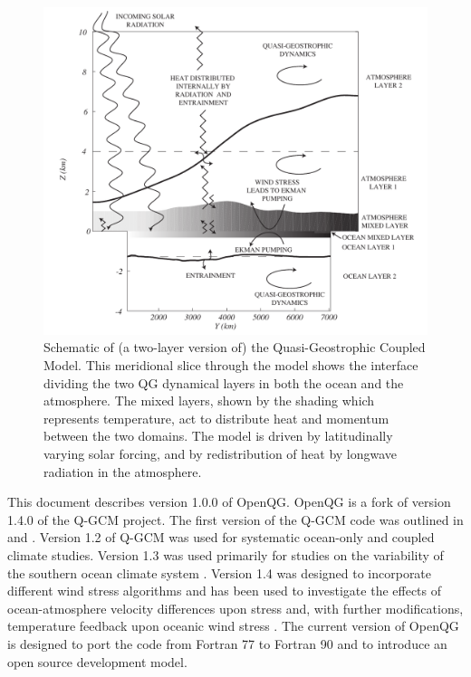 \documentclass[11pt, a4paper,twoside]{article}
\numberwithin{equation}{section}
\begin{document}
\begin{figure}[!t]
\includegraphics[width=\hsize]{sketch}
\caption{\small Schematic of (a two-layer version of) the Quasi-Geostrophic Coupled Model. This
meridional slice through the model shows the interface dividing the two QG
dynamical layers in both the ocean and the atmosphere. The mixed layers,
shown by the shading which represents temperature, act to distribute heat
and momentum between the two domains. The model is driven by latitudinally
varying solar forcing, and by redistribution of heat by longwave radiation
in the atmosphere.\label{fig:sketch}}
\end{figure}

This document describes version 1.0.0 of OpenQG.
OpenQG is a fork of version 1.4.0 of the Q-GCM project.
The first version of the Q-GCM code was outlined in \citet{hogg:03b} and \citet{hogg:03c}.
Version 1.2 of Q-GCM was used for systematic ocean-only \citep{hogg:05a} and coupled climate \citep{hogg:06a,hogg:07} studies.
Version 1.3 was used primarily for studies on the variability of the southern ocean climate system \citep{hogg:06c,meredith:06,hogg:08b}.
Version 1.4 was designed to incorporate different wind stress algorithms and has been used to investigate the effects of ocean-atmosphere velocity differences upon stress \citep{hutchinson:10} and, with further modifications, temperature feedback upon oceanic wind stress \citep{hogg:09}.
The current version of OpenQG is designed to port the code from Fortran 77 to Fortran 90 and to introduce an open source development model.
\end{document}
